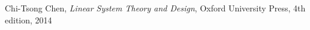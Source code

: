 \begin{thebibliography}{9}
  Chi-Tsong Chen,
  \emph{Linear System Theory and Design},
  Oxford University Press,
  4th edition,
  2014
\end{thebibliography}